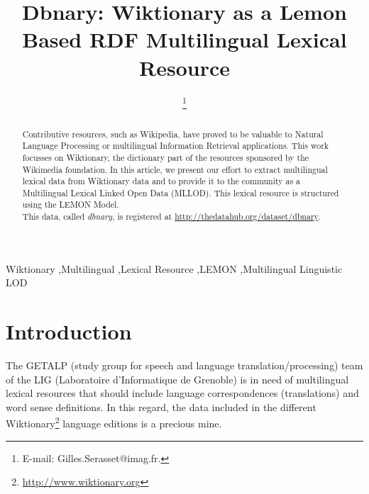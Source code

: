 \documentclass[sw]{iosart2c}
\begin{document}
\begin{frontmatter}

\title{Dbnary: Wiktionary as a Lemon Based RDF Multilingual Lexical Resource}



\author{ \thanks{E-mail: Gilles.Serasset@imag.fr.}}
\address{GETALP-LIG, UJF-Grenoble 1 \\BP 53, 38051 Grenoble cedex 9, France\\ \texttt{gilles.serasset@imag.fr}}


\begin{abstract}
Contributive resources, such as Wikipedia, have proved to be valuable to Natural Language Processing or multilingual Information Retrieval applications. This work focusses on Wiktionary, the dictionary part of the resources sponsored by the Wikimedia foundation. In this article, we present our effort to extract multilingual lexical data from Wiktionary data and to provide it to the community as a Multilingual Lexical Linked Open Data (MLLOD). This lexical resource is structured using the LEMON Model.\\
This data, called \textit{dbnary}, is registered at \url{http://thedatahub.org/dataset/dbnary}.
\end{abstract}

\begin{keyword}
Wiktionary \sep Multilingual \sep Lexical Resource \sep LEMON \sep Multilingual Linguistic LOD
\end{keyword}

\end{frontmatter}

\section{Introduction}

The GETALP (study group for speech and language translation/processing) team of the LIG (Laboratoire d'Informatique de Grenoble) is in need of multilingual lexical resources that should include language correspondences (translations) and word sense definitions. In this regard, the data included in the different Wiktionary\footnote{\url{http://www.wiktionary.org}} language editions is a precious mine.
\end{document}
